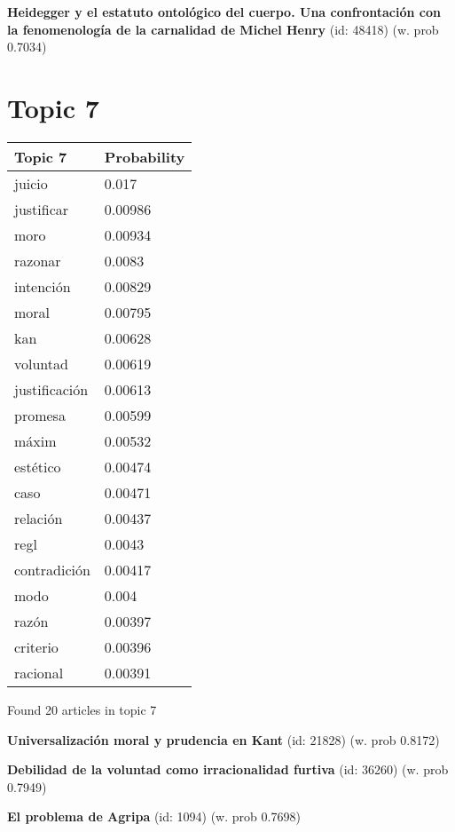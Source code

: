 \documentclass{article}
\begin{document}
\textbf{Heidegger y el estatuto ontológico del cuerpo. Una confrontación con la fenomenología de la carnalidad de Michel Henry} (id: 48418)
 (w. prob 0.7034)

\vfill
\newpage


\centering
\thispagestyle{empty}
\section*{Topic 7}\vfill
\begin{tabular}{ll}
\toprule
       Topic 7 & Probability \\
\midrule
        juicio &       0.017 \\
    justificar &     0.00986 \\
          moro &     0.00934 \\
       razonar &      0.0083 \\
     intención &     0.00829 \\
         moral &     0.00795 \\
           kan &     0.00628 \\
      voluntad &     0.00619 \\
 justificación &     0.00613 \\
       promesa &     0.00599 \\
         máxim &     0.00532 \\
      estético &     0.00474 \\
          caso &     0.00471 \\
      relación &     0.00437 \\
          regl &      0.0043 \\
  contradición &     0.00417 \\
          modo &       0.004 \\
         razón &     0.00397 \\
      criterio &     0.00396 \\
      racional &     0.00391 \\
\bottomrule
\end{tabular}

\vfill
Found 20 articles in topic 7
\vfill

\textbf{Universalización moral y prudencia en Kant} (id: 21828)
 (w. prob 0.8172)
\vfill

\textbf{Debilidad de la voluntad como irracionalidad furtiva} (id: 36260)
 (w. prob 0.7949)
\vfill

\textbf{El problema de Agripa} (id: 1094)
 (w. prob 0.7698)
\end{document}
